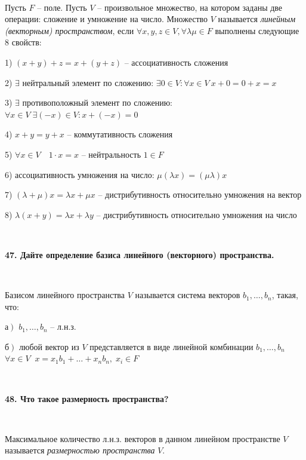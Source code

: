 \documentclass{article}
\begin{document}
    {
        $\;$
        \setlength{\parindent}{0.4cm}
        \hangindent=0.4cm

    Пусть $F$ -- поле. Пусть $V$ -- произвольное множество, на котором заданы две операции: сложение и умножение на число. Множество $V$ называется \textit{линейным (векторным) пространством}, если $\forall x, y, z\in V, \forall\lambda\mu\in F$ выполнены следующие 8 свойств:

    1) $(x+y)+z=x+(y+z)$ -- ассоциативность сложения

    2) $\exists$ нейтральный элемент по сложению: $\exists 0\in V:\forall x\in V\ x+0=0+x=x$

        3) $\exists$ противоположный элемент по сложению: $\forall x\in V\;\exists(-x)\in V:x+(-x)=0$

        4) $x+y=y+x$ -- коммутативность сложения

    5) $\forall x\in V\quad1\cdot x=x$ -- нейтральность $1\in F$

        6) ассоциативность умножения на число: $\mu(\lambda x)=(\mu\lambda)x$

        7) $(\lambda+\mu)x=\lambda x+\mu x$ -- дистрибутивность относительно умножения на вектор

    8) $\lambda(x+y)=\lambda x+\lambda y$ -- дистрибутивность относительно умножения на число

        $\;$
        \setlength{\parindent}{0cm}
        \hangindent=0cm
    }

    \textbf{47. Дайте определение базиса линейного (векторного) пространства.}

    {
        $\;$
        \setlength{\parindent}{0.4cm}
        \hangindent=0.4cm

    Базисом линейного пространства $V$ называется система векторов $b_1, \ldots, b_n$, такая, что:

    а$\left. \right) $ $b_1, \ldots, b_n$ -- л.н.з.

    б$\left. \right) $ любой вектор из $V$ представляется в виде линейной комбинации $b_1, \ldots, b_n$ $\forall x\in V\;\; x=x_1b_1+\ldots+x_nb_n,\; x_i\in F$

        $\;$
        \setlength{\parindent}{0cm}
        \hangindent=0cm
    }

    \textbf{48. Что такое размерность пространства?}

    {
        $\;$
        \setlength{\parindent}{0.4cm}
        \hangindent=0.4cm

    Максимальное количество л.н.з. векторов в данном линейном пространстве $V$ называется \textit{размерностью пространства} $V$.

        $\;$
        \setlength{\parindent}{0cm}
        \hangindent=0cm
    }
\end{document}

